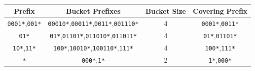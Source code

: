 \begin{qsolve}
\begin{enumerate}
		
		\begin{latin}
			\begin{center}
				\begin{tabular}{|c|c|c|c|}
					\hline
					Prefix & Bucket Prefixes & Bucket Size & Covering Prefix  \\
					\hline\hline
					\texttt{0001*},\texttt{001*} & \texttt{00010*},\texttt{00011*},\texttt{0011*},\texttt{001110*} & 4 & \texttt{0001*},\texttt{0011*}  \\
					\hline
					\texttt{01*} & \texttt{01*},\texttt{01101*},\texttt{011010*},\texttt{011011*} & 4 & \texttt{01*},\texttt{01101*}  \\
					\hline
					\texttt{10*},\texttt{11*} & \texttt{100*},\texttt{10010*},\texttt{100110*},\texttt{111*} & 4 & \texttt{100*},\texttt{111*}  \\
					\hline
					\texttt{*} & \texttt{000*},\texttt{1*} & 2 & \texttt{1*},\texttt{000*}  \\
					\hline
				\end{tabular}
			\end{center}
		\end{latin}
		
	\end{enumerate}
\end{qsolve}